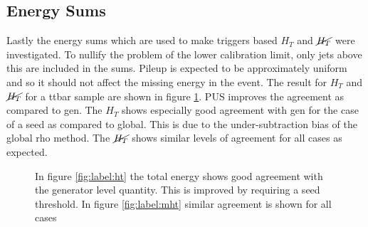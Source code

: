 \subsection{Energy Sums}
Lastly the energy sums which are used to make triggers based $H_T$ and $\cancel{H_T}$ were investigated. To nullify the problem of the lower calibration limit, only jets above this are included in the sums. Pileup is expected to be approximately uniform and so it should not affect the missing energy in the event. The result for $H_T$ and $\cancel{H_T}$ for a ttbar sample are shown in figure \ref{fig:label:sums}. PUS improves the agreement as compared to gen.  The $H_T$ shows especially good agreement with gen for the case of a seed as compared to global. This is due to the under-subtraction bias of the global rho method. The $\cancel{H_T}$ shows similar levels of agreement for all cases as expected. 
\begin{figure}
\hfill
{}
\hfill
{}
\caption{In figure \ref{fig:label:ht} the total energy shows good agreement with the generator level quantity. This is improved by requiring a seed threshold. In figure \ref{fig:label:mht} similar agreement is shown for all cases}
\label{fig:label:sums}
\end{figure}
